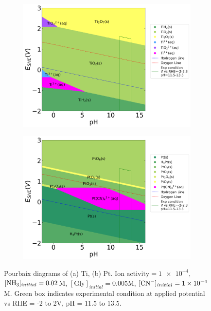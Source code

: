 \documentclass[journal=jacsat,manuscript=article]{achemso}
\begin{document}
\begin{figure}[htbp]
    \centering
    \begin{subfigure}[b]{0.45\textwidth}
        \subcaption{}\label{fig:Ti_Pourbaix_NH3_Gly_CN}
        \includegraphics[width=\textwidth]{Figures/pourbaix_diagrams/Ti-NH3-H2O_activity=1e-04_[NH3]=0.02M_[Gly]=0.005M_[CN]=0.0001.png}
        \par\medskip
    \end{subfigure}
    \begin{subfigure}[b]{0.45\textwidth}
        \subcaption{}\label{fig:Pt_Pourbaix_NH3_Gly_CN}
        \includegraphics[width=\textwidth]{Figures/pourbaix_diagrams/Pt-NH3-H2O_activity=1e-04_[NH3]=0.02M_[Gly]=0.005M_[CN]=0.0001.png}
        \par\medskip   
    \end{subfigure}
    \caption{Pourbaix diagrams of (a) Ti, (b) Pt. $\text{Ion activity}=\num{1e-4}$, $[\ce{NH3}]_{initial}= 0.02$M, $[\text{Gly}]_{initial}=0.005$M,  $[\ce{CN-}]_{initial}=\num{1e-4}$M. Green box indicates experimental condition at applied potential vs RHE = -2 to 2V, pH = 11.5 to 13.5.}
    \label{fig:Ti_Pt_Pourbaix}
\end{figure}
\end{document}
